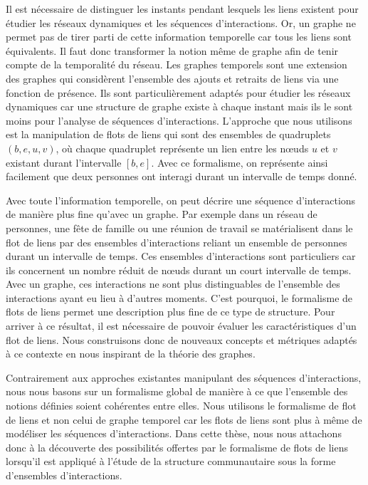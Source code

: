 Il est nécessaire de distinguer les instants pendant lesquels les liens existent pour étudier les réseaux dynamiques et les séquences d'interactions.
Or, un graphe ne permet pas de tirer parti de cette information temporelle car tous les liens sont équivalents. 
Il faut donc transformer la notion même de graphe afin de tenir compte de la temporalité du réseau.
Les graphes temporels sont une extension des graphes qui considèrent l'ensemble des ajouts et retraits de liens via une fonction de présence.
Ils sont particulièrement adaptés pour étudier les réseaux dynamiques car une structure de graphe existe à chaque instant mais ils le sont moins pour l'analyse de séquences d'interactions.
L'approche que nous utilisons est la manipulation de flots de liens qui sont des ensembles de quadruplets $(b, e, u, v)$, où chaque quadruplet représente un lien entre les n\oe{}uds $u$ et $v$ existant durant l'intervalle $[b,e]$.
Avec ce formalisme, on représente ainsi facilement que deux personnes ont interagi durant un intervalle de temps donné.


Avec toute l'information temporelle, on peut décrire une séquence d'interactions de manière plus fine qu'avec un graphe.
Par exemple dans un réseau de personnes, une fête de famille ou une réunion de travail se matérialisent dans le flot de liens par des ensembles d'interactions reliant un ensemble de personnes durant un intervalle de temps.
Ces ensembles d'interactions sont particuliers car ils concernent un nombre réduit de n\oe{}uds durant un court intervalle de temps.
Avec un graphe, ces interactions ne sont plus distinguables de l'ensemble des interactions ayant eu lieu à d'autres moments.
C'est pourquoi, le formalisme de flots de liens permet une description plus fine de ce type de structure.
Pour arriver à ce résultat, il est nécessaire de pouvoir évaluer les caractéristiques d'un flot de liens.
Nous construisons donc de nouveaux concepts et métriques adaptés à ce contexte en nous inspirant de la théorie des graphes.


\bigskip


Contrairement aux approches existantes manipulant des séquences d'interactions, nous nous basons sur un formalisme global de manière à ce que l'ensemble des notions définies soient cohérentes entre elles.
Nous utilisons le formalisme de flot de liens et non celui de graphe temporel car les flots de liens sont plus à même de modéliser les séquences d'interactions.
Dans cette thèse, nous nous attachons donc à la découverte des possibilités offertes par le formalisme de flots de liens lorsqu'il est appliqué à l'étude de la structure communautaire sous la forme d'ensembles d'interactions.

